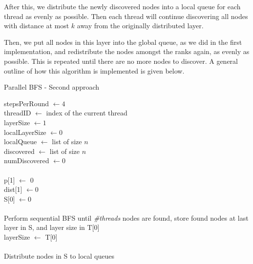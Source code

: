 \documentclass{article}
\begin{document}
After this, we distribute the newly discovered nodes into a local queue for each thread as evenly as possible. Then each thread will continue discovering all nodes with distance at most \( k \) away from the originally distributed layer. 
\medskip

Then, we put all nodes in this layer into the global queue, as we did in the first implementation, and redistribute the nodes amongst the ranks again, as evenly as possible. This is repeated until there are no more nodes to discover. A general outline of how this algorithm is implemented is given below.

\begin{algorithm}[H]
    \caption{Parallel BFS - Second approach}
    \SetAlgoVlined
    stepsPerRound \( \leftarrow 4 \)\\
    threadID \( \leftarrow \) index of the current thread\\
    layerSize \( \leftarrow 1 \)\\
    localLayerSize \( \leftarrow 0 \)\\
    localQueue \( \leftarrow \) list of size \( n \)\\
    discovered \( \leftarrow \) list of size \( n \)\\
    numDiscovered \( \leftarrow 0 \)\\
    \phantom{a}\\
    p[1] \( \leftarrow \) 0 \\
    dist[1] \( \leftarrow 0 \)  \\
    S[0] \( \leftarrow 0\) \\
    \phantom{a}\\
    Perform sequential BFS until \textit{\#threads} nodes are found, store found nodes at last layer in S, and layer size in T[0]\\

    layerSize \( \leftarrow \) T[0] \\
    \phantom{a}\\

    Distribute nodes in S to local queues\\
    \phantom{a}\\


\end{algorithm}
\end{document}
